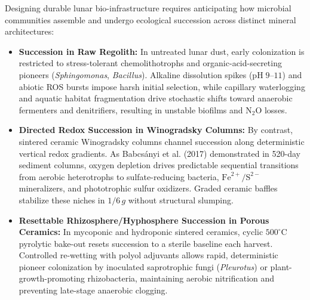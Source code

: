 Designing durable lunar bio-infrastructure requires anticipating how microbial communities assemble and undergo ecological succession across distinct mineral architectures:
\begin{itemize}
    \item \textbf{Succession in Raw Regolith:} In untreated lunar dust, early colonization is restricted to stress-tolerant chemolithotrophs and organic-acid-secreting pioneers (\textit{Sphingomonas}, \textit{Bacillus})\cite{cockell2018biorock,santomartino2024ecomine}. Alkaline dissolution spikes ($\mathrm{pH}\;9\text{--}11$) and abiotic ROS bursts impose harsh initial selection, while capillary waterlogging and aquatic habitat fragmentation\cite{jones2012beyond,wang2010aqueous} drive stochastic shifts toward anaerobic fermenters and denitrifiers, resulting in unstable biofilms and $\mathrm{N}_2\mathrm{O}$ losses\cite{maggi2010space}.
    \item \textbf{Directed Redox Succession in Winogradsky Columns:} By contrast, sintered ceramic Winogradsky columns channel succession along deterministic vertical redox gradients\cite{babcsanyi2017biogeochemical}. As Babcs{\'a}nyi et al. (2017) demonstrated in 520-day sediment columns, oxygen depletion drives predictable sequential transitions from aerobic heterotrophs to sulfate-reducing bacteria, $\mathrm{Fe}^{2+}/\mathrm{S}^{2-}$ mineralizers, and phototrophic sulfur oxidizers\cite{babcsanyi2017biogeochemical}. Graded ceramic baffles stabilize these niches in $1/6\,g$ without structural slumping.
    \item \textbf{Resettable Rhizosphere/Hyphosphere Succession in Porous Ceramics:} In mycoponic and hydroponic sintered ceramics, cyclic $500^\circ\mathrm{C}$ pyrolytic bake-out resets succession to a sterile baseline each harvest. Controlled re-wetting with polyol adjuvants allows rapid, deterministic pioneer colonization by inoculated saprotrophic fungi (\textit{Pleurotus}) or plant-growth-promoting rhizobacteria, maintaining aerobic nitrification and preventing late-stage anaerobic clogging.
\end{itemize}

